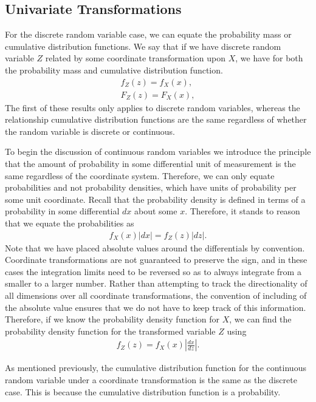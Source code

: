 \subsection{Univariate Transformations}

For the discrete random variable case, we can equate the probability mass or cumulative distribution functions. We say that if we have discrete random variable $Z$ related by some coordinate transformation upon $X$, we have for both the probability mass and cumulative distribution function.
\begin{align}
  f_Z(z) = f_X(x), \\
  F_Z(z) = F_X(x),
\end{align}
The first of these results only applies to discrete random variables, whereas the relationship cumulative distribution functions are the same regardless of whether the random variable is discrete or continuous.

To begin the discussion of continuous random variables we introduce the principle that the amount of probability in some differential unit of measurement is the same regardless of the coordinate system. Therefore, we can only equate probabilities and not probability densities, which have units of probability per some unit coordinate. Recall that the probability density is defined in terms of a probability in some differential $dx$ about some $x$. Therefore, it stands to reason that we equate the probabilities as
\begin{align}
  f_X(x) |dx| = f_Z(z) |dz| . \nonumber
\end{align}
Note that we have placed absolute values around the differentials by convention. Coordinate transformations are not guaranteed to preserve the sign, and in these cases the integration limits need to be reversed so as to always integrate from a smaller to a larger number. Rather than attempting to track the directionality of all dimensions over all coordinate transformations, the convention of including of the absolute value ensures that we do not have to keep track of this information. Therefore, if we know the probability density function for $X$, we can find the probability density function for the transformed variable $Z$ using
\begin{align}
  f_Z(z) = f_X(x) \left| \frac{dx}{dz} \right|  . 
\end{align}

As mentioned previously, the cumulative distribution function for the continuous random variable under a coordinate transformation is the same as the discrete case. This is because the cumulative distribution function is a probability.

